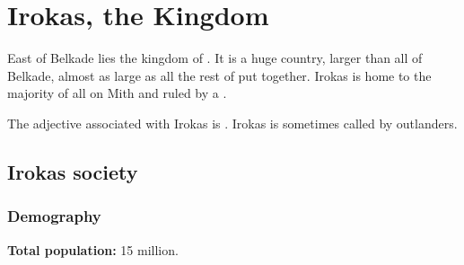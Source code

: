 \chapter{Irokas, the \Dragon{} Kingdom}


East of Belkade lies the \draconic{} kingdom of . It is a huge country, larger than all of Belkade, almost as large as all the rest of \KnownWorld{} put together. Irokas is home to the majority of all \dragons{} on Mith and ruled by a \DragonKing{}. 

The adjective associated with Irokas is . Irokas is sometimes called \quo{\intro{\Dragonland}} by outlanders. 

\section{Irokas society}
\subsection{Demography}
\textbf{Total population:} 15 million. 

